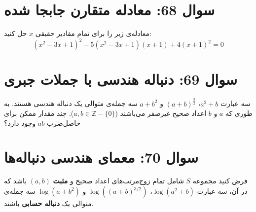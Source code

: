 \documentclass[12pt]{article}
\begin{document}
	\vspace{1cm}
	\hrulefill
	\vspace{1cm}
	
	\section*{سوال 68: معادله متقارن جابجا شده}
	معادله‌ی زیر را برای تمام مقادیر حقیقی \(x\) حل کنید:
	\begin{displaymath}
		(x^2 - 3x + 1)^2 - 5(x^2 - 3x + 1)(x+1) + 4(x+1)^2 = 0
	\end{displaymath}
	
	\vspace{1cm}
	\hrulefill
	\vspace{1cm}
	
	
	\section*{سوال 69: دنباله هندسی با جملات جبری}
	سه عبارت \( a^2+b \)، \( (a+b)^{\frac{3}{2}} \) و \( a+b^2 \) سه جمله‌ی متوالی یک دنباله هندسی هستند.
	به طوری که \(a\) و \(b\) اعداد صحیح غیرصفر می‌باشند (\(a, b \in \mathbb{Z} - \{0\}\)).
	چند مقدار ممکن برای حاصل‌ضرب \(ab\) وجود دارد؟
	
	\vspace{1cm}
	\hrulefill
	\vspace{1cm}
	
	\section*{سوال 70: معمای هندسی دنباله‌ها}
	فرض کنید مجموعه \(S\) شامل تمام زوج‌مرتب‌های اعداد صحیح و \textbf{مثبت} \( (a,b) \) باشد که در آن، سه عبارت \( \log(a^2+b) \)، \( \log\left((a+b)^{3/2}\right) \) و \( \log(a+b^2) \) سه جمله‌ی متوالی یک \textbf{دنباله حسابی} باشند.
	
\end{document}
